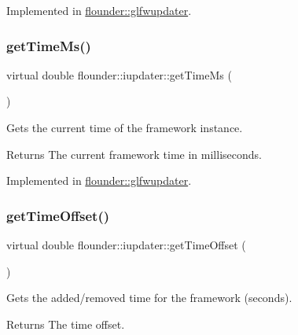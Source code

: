 Implemented in \hyperlink{classflounder_1_1glfwupdater_a284945635b93ffc1bd6164ff20565349}{flounder\+::glfwupdater}.

\mbox{\label{classflounder_1_1iupdater_a56548faad88ad85e0cb4bc96af0912d6}} 
\subsubsection{\texorpdfstring{get\+Time\+Ms()}{getTimeMs()}}
{\footnotesize\ttfamily virtual double flounder\+::iupdater\+::get\+Time\+Ms (\begin{DoxyParamCaption}{ }\end{DoxyParamCaption})\hspace{0.3cm}{\ttfamily [pure virtual]}}



Gets the current time of the framework instance. 

\begin{DoxyReturn}{Returns}
The current framework time in milliseconds. 
\end{DoxyReturn}


Implemented in \hyperlink{classflounder_1_1glfwupdater_a1c3b884efb6e785143db556d4db9bdc8}{flounder\+::glfwupdater}.

\mbox{\label{classflounder_1_1iupdater_abd983cbbeed27f28e9be768a2d3b69f2}} 
\subsubsection{\texorpdfstring{get\+Time\+Offset()}{getTimeOffset()}}
{\footnotesize\ttfamily virtual double flounder\+::iupdater\+::get\+Time\+Offset (\begin{DoxyParamCaption}{ }\end{DoxyParamCaption})\hspace{0.3cm}{\ttfamily [pure virtual]}}



Gets the added/removed time for the framework (seconds). 

\begin{DoxyReturn}{Returns}
The time offset. 
\end{DoxyReturn}


